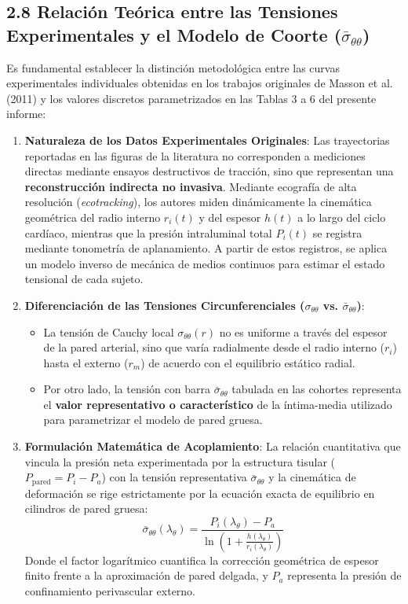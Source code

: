 \documentclass[10pt,a4paper]{article}
\begin{document}
\subsection{2.8 Relación Teórica entre las Tensiones Experimentales y el Modelo de Coorte ($\bar{\sigma}_{\theta\theta}$)}
Es fundamental establecer la distinción metodológica entre las curvas experimentales individuales obtenidas en los trabajos originales de Masson et al. (2011) y los valores discretos parametrizados en las Tablas 3 a 6 del presente informe:

\begin{enumerate}
\item \textbf{Naturaleza de los Datos Experimentales Originales}: Las trayectorias reportadas en las figuras de la literatura no corresponden a mediciones directas mediante ensayos destructivos de tracción, sino que representan una \textbf{reconstrucción indirecta no invasiva}. Mediante ecografía de alta resolución (\textit{ecotracking}), los autores miden dinámicamente la cinemática geométrica del radio interno $r_i(t)$ y del espesor $h(t)$ a lo largo del ciclo cardíaco, mientras que la presión intraluminal total $P_i(t)$ se registra mediante tonometría de aplanamiento. A partir de estos registros, se aplica un modelo inverso de mecánica de medios continuos para estimar el estado tensional de cada sujeto.
\item \textbf{Diferenciación de las Tensiones Circunferenciales ($\sigma_{\theta\theta}$ vs. $\bar{\sigma}_{\theta\theta}$)}:
\begin{itemize}
\item La tensión de Cauchy local $\sigma_{\theta\theta}(r)$ no es uniforme a través del espesor de la pared arterial, sino que varía radialmente desde el radio interno ($r_i$) hasta el externo ($r_m$) de acuerdo con el equilibrio estático radial.
\item Por otro lado, la tensión con barra $\bar{\sigma}_{\theta\theta}$ tabulada en las cohortes representa el \textbf{valor representativo o característico} de la íntima-media utilizado para parametrizar el modelo de pared gruesa.
\end{itemize}
\item \textbf{Formulación Matemática de Acoplamiento}: La relación cuantitativa que vincula la presión neta experimentada por la estructura tisular ($P_{\text{pared}} = P_i - P_a$) con la tensión representativa $\bar{\sigma}_{\theta\theta}$ y la cinemática de deformación se rige estrictamente por la ecuación exacta de equilibrio en cilindros de pared gruesa:
\begin{equation}
\bar{\sigma}_{\theta\theta}(\lambda_\theta) = \frac{P_i(\lambda_\theta) - P_a}{\ln\left(1 + \frac{h(\lambda_\theta)}{r_i(\lambda_\theta)}\right)}
\end{equation}
Donde el factor logarítmico cuantifica la corrección geométrica de espesor finito frente a la aproximación de pared delgada, y $P_a$ representa la presión de confinamiento perivascular externo.
\end{enumerate}
\end{document}
